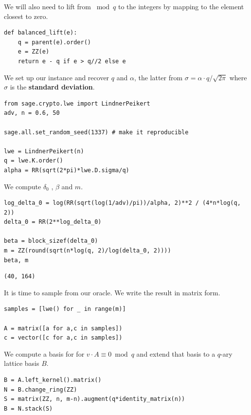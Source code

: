\documentclass[10pt,a4paper,nobib]{tufte-handout}
\begin{document}
We will also need to lift from \(\bmod q\) to the integers by mapping to the element closest to zero.

\lstset{language=sage,label= ,caption= ,captionpos=b,numbers=none}
\begin{lstlisting}
def balanced_lift(e):
    q = parent(e).order()
    e = ZZ(e)
    return e - q if e > q//2 else e
\end{lstlisting}

We set up our instance and recover \(q\) and \(α\), the latter from \(σ = α⋅q/\sqrt{2π}\) where \(σ\) is the \textbf{standard deviation}.

\lstset{language=sage,label= ,caption= ,captionpos=b,numbers=none}
\begin{lstlisting}
from sage.crypto.lwe import LindnerPeikert
adv, n = 0.6, 50

sage.all.set_random_seed(1337) # make it reproducible

lwe = LindnerPeikert(n)
q = lwe.K.order()
alpha = RR(sqrt(2*pi)*lwe.D.sigma/q)
\end{lstlisting}

We compute \(δ_0\) , \(β\) and \(m\).

\lstset{language=sage,label= ,caption= ,captionpos=b,numbers=none}
\begin{lstlisting}
log_delta_0 = log(RR(sqrt(log(1/adv)/pi))/alpha, 2)**2 / (4*n*log(q, 2))
delta_0 = RR(2**log_delta_0)

beta = block_sizef(delta_0)
m = ZZ(round(sqrt(n*log(q, 2)/log(delta_0, 2))))
beta, m
\end{lstlisting}

\begin{verbatim}
(40, 164)
\end{verbatim}

It is time to sample from our oracle. We write the result in matrix form.

\lstset{language=sage,label= ,caption= ,captionpos=b,numbers=none}
\begin{lstlisting}
samples = [lwe() for _ in range(m)]

A = matrix([a for a,c in samples])
c = vector([c for a,c in samples])
\end{lstlisting}

We compute a basis for for \(v ⋅ A ≡ 0 \bmod q\) and extend that basis to a \(q\)-ary lattice basis \(B\).

\lstset{language=sage,label= ,caption= ,captionpos=b,numbers=none}
\begin{lstlisting}
B = A.left_kernel().matrix()
N = B.change_ring(ZZ)
S = matrix(ZZ, n, m-n).augment(q*identity_matrix(n))
B = N.stack(S)
\end{lstlisting}
\end{document}
